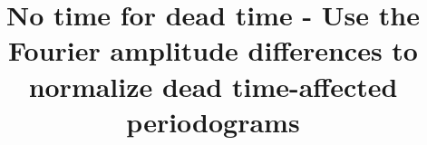 \documentclass[twocolumn]{aastex61}
\begin{document}
\title{No time for dead time - Use the Fourier amplitude differences to normalize dead time-affected periodograms}


\end{document}
